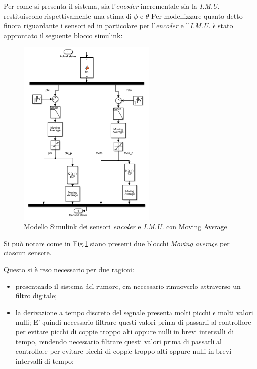 Per come si presenta il sistema, sia l'\textit{encoder} incrementale sia la \textit{I.M.U.} restituiscono rispettivamente una stima di $\phi$ e $\theta$
Per modellizzare quanto detto finora riguardante i sensori ed in particolare per l'\textit{encoder} e l'\textit{I.M.U.} è stato approntato il seguente blocco simulink:
\begin{figure}[H]
	\centering   	
	\includegraphics[width=0.6\textwidth]{Immagini/sensor_block1.png}
	\caption{Modello Simulink dei sensori \textit{encoder} e \textit{I.M.U.} con Moving Average}
	\label{fig:sensor_block1}
\end{figure}
Si può notare come in Fig.\ref{fig:sensor_block1} siano presenti due blocchi \textit{Moving average} per ciascun sensore.

Questo si è reso necessario per due ragioni:
\begin{itemize}
	\item  presentando il sistema del rumore, era necessario rimuoverlo attraverso un filtro digitale;
	\item la derivazione a tempo discreto del segnale presenta molti picchi e molti valori nulli;
	E' quindi necessario filtrare questi valori prima di passarli al controllore per evitare picchi di coppie troppo alti oppure nulli in brevi intervalli di tempo, rendendo necessario filtrare questi valori prima di passarli al controllore per evitare picchi di coppie troppo alti oppure nulli in brevi intervalli di tempo;
\end{itemize}

